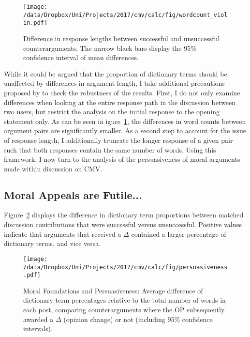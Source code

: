 \begin{figure}[ht]
\centering
\texttt{[image: /data/Dropbox/Uni/Projects/2017/cmv/calc/fig/wordcount\_violin.pdf]}
\caption{Difference in response lengths between successful and unsuccessful counterarguments. The narrow black bars display the 95\% confidence interval of mean differences.}\label{fig:wordcount_violin}
\end{figure}

While it could be argued that the proportion of dictionary terms should be unaffected by differences in argument length, I take additional precautions proposed by \citet{tan2016winning} to check the robustness of the results. First, I do not only examine differences when looking at the entire response path in the discussion between two users, but restrict the analysis on the initial response to the opening statement only. As can be seen in igure~\ref{fig:wordcount_violin}, the differences in word counts between argument pairs are significantly smaller. As a second step to account for the issue of response length, I additionally truncate the longer response of a given pair such that both responses contain the same number of words. Using this framework, I now turn to the analysis of the persuasiveness of moral arguments made within discussion on CMV.


\subsection{Moral Appeals are Futile...}

Figure~\ref{fig:persuasiveness} displays the difference in dictionary term proportions between matched discussion contributions that were successful versus unsuccessful. Positive values indicate that arguments that received a $\Delta$ contained a larger percentage of dictionary terms, and vice versa.

\begin{figure}[ht]
\centering
\texttt{[image: /data/Dropbox/Uni/Projects/2017/cmv/calc/fig/persuasiveness.pdf]}
\caption[Moral Foundations and Persuasiveness]{Moral Foundations and Persuasiveness: Average difference of dictionary term percentages relative to the total number of words in each post, comparing counterarguments where the OP subsequently awarded a $\Delta$ (opinion change) or not (including 95\% confidence intervals).}\label{fig:persuasiveness}
\end{figure}

